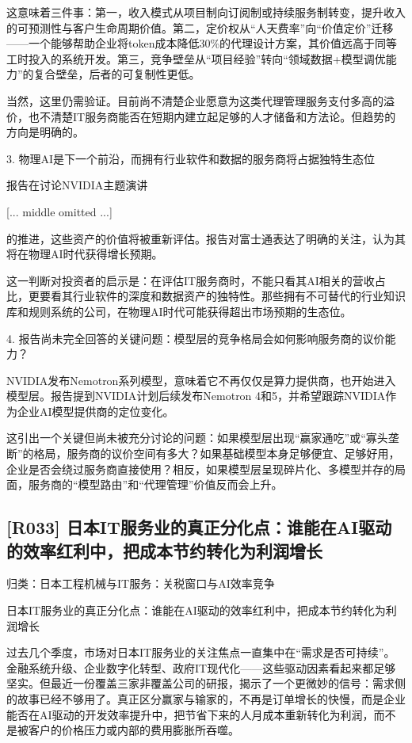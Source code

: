 \documentclass[11pt]{ctexart}
\begin{document}
这意味着三件事：第一，收入模式从项目制向订阅制或持续服务制转变，提升收入的可预测性与客户生命周期价值。第二，定价权从“人天费率”向“价值定价”迁移——一个能够帮助企业将token成本降低30\%的代理设计方案，其价值远高于同等工时投入的系统开发。第三，竞争壁垒从“项目经验”转向“领域数据+模型调优能力”的复合壁垒，后者的可复制性更低。

当然，这里仍需验证。目前尚不清楚企业愿意为这类代理管理服务支付多高的溢价，也不清楚IT服务商能否在短期内建立起足够的人才储备和方法论。但趋势的方向是明确的。

3. 物理AI是下一个前沿，而拥有行业软件和数据的服务商将占据独特生态位

报告在讨论NVIDIA主题演讲

[... middle omitted ...]

的推进，这些资产的价值将被重新评估。报告对富士通表达了明确的关注，认为其将在物理AI时代获得增长预期。

这一判断对投资者的启示是：在评估IT服务商时，不能只看其AI相关的营收占比，更要看其行业软件的深度和数据资产的独特性。那些拥有不可替代的行业知识库和规则系统的公司，在物理AI时代可能获得超出市场预期的生态位。

4. 报告尚未完全回答的关键问题：模型层的竞争格局会如何影响服务商的议价能力？

NVIDIA发布Nemotron系列模型，意味着它不再仅仅是算力提供商，也开始进入模型层。报告提到NVIDIA计划后续发布Nemotron 4和5，并希望跟踪NVIDIA作为企业AI模型提供商的定位变化。

这引出一个关键但尚未被充分讨论的问题：如果模型层出现“赢家通吃”或“寡头垄断”的格局，服务商的议价空间有多大？如果基础模型本身足够便宜、足够好用，企业是否会绕过服务商直接使用？相反，如果模型层呈现碎片化、多模型并存的局面，服务商的“模型路由”和“代理管理”价值反而会上升。

\subsection{[R033] 日本IT服务业的真正分化点：谁能在AI驱动的效率红利中，把成本节约转化为利润增长}
{\small\color{refgray}归类：日本工程机械与IT服务：关税窗口与AI效率竞争}

日本IT服务业的真正分化点：谁能在AI驱动的效率红利中，把成本节约转化为利润增长

过去几个季度，市场对日本IT服务业的关注焦点一直集中在“需求是否可持续”。金融系统升级、企业数字化转型、政府IT现代化——这些驱动因素看起来都足够坚实。但最近一份覆盖三家非覆盖公司的研报，揭示了一个更微妙的信号：需求侧的故事已经不够用了。真正区分赢家与输家的，不再是订单增长的快慢，而是企业能否在AI驱动的开发效率提升中，把节省下来的人月成本重新转化为利润，而不是被客户的价格压力或内部的费用膨胀所吞噬。
\end{document}
